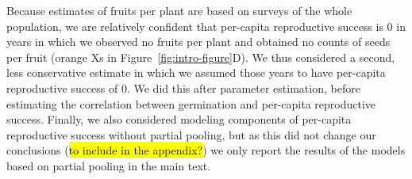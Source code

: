 \documentclass[12pt, oneside, titlepage]{article}   	%
\begin{document}
{Because estimates of fruits per plant are based on surveys of the whole population, we are relatively confident that per-capita reproductive success is 0 in years in which we observed no fruits per plant and obtained no counts of seeds per fruit (orange Xs in Figure~\ref{fig:intro-figure}D). We thus considered a second, less conservative estimate in which we assumed those years to have per-capita reproductive success of 0. We did this after parameter estimation, before estimating the correlation between germination and per-capita reproductive success. Finally, we also considered modeling components of per-capita reproductive success without partial pooling, but as this did not change our conclusions (\hl{to include in the appendix?}) we only report the results of the models based on partial pooling in the main text.  




}
\end{document}
